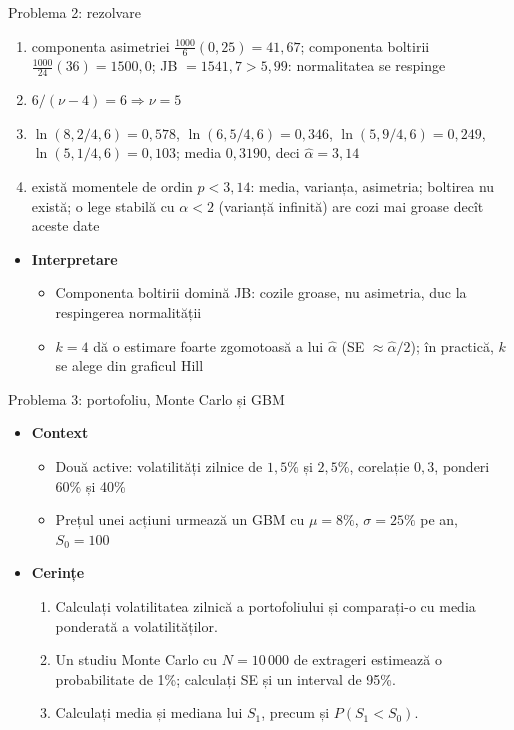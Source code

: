 \begin{frame}{Problema 2: rezolvare}
\itemsize{\footnotesize}
\begin{enumerate}
    \item componenta asimetriei $\frac{1000}{6}(0{,}25) = 41{,}67$; componenta boltirii $\frac{1000}{24}(36) = 1500{,}0$; JB $= 1541{,}7 > 5{,}99$: normalitatea se respinge
    \item $6/(\nu - 4) = 6 \Rightarrow \nu = 5$
    \item $\ln(8{,}2/4{,}6) = 0{,}578$, $\ln(6{,}5/4{,}6) = 0{,}346$, $\ln(5{,}9/4{,}6) = 0{,}249$, $\ln(5{,}1/4{,}6) = 0{,}103$; media $0{,}3190$, deci $\hat\alpha = 3{,}14$
    \item există momentele de ordin $p < 3{,}14$: media, varianța, asimetria; boltirea nu există; o lege stabilă cu $\alpha < 2$ (varianță infinită) are cozi mai groase decît aceste date
\end{enumerate}
\begin{itemize}
    \item \textbf{Interpretare}
    \begin{itemize}
        \item Componenta boltirii domină JB: cozile groase, nu asimetria, duc la respingerea normalității
        \item $k = 4$ dă o estimare foarte zgomotoasă a lui $\hat\alpha$ (SE $\approx \hat\alpha/2$); în practică, $k$ se alege din graficul Hill
    \end{itemize}
\end{itemize}
\end{frame}

\begin{frame}{Problema 3: portofoliu, Monte Carlo și GBM}
\itemsize{\footnotesize}
\begin{itemize}
    \item \textbf{Context}
    \begin{itemize}
        \item Două active: volatilități zilnice de $1{,}5\%$ și $2{,}5\%$, corelație $0{,}3$, ponderi 60\% și 40\%
        \item Prețul unei acțiuni urmează un GBM cu $\mu = 8\%$, $\sigma = 25\%$ pe an, $S_0 = 100$
    \end{itemize}
    \item \textbf{Cerințe}
\begin{enumerate}
    \item Calculați volatilitatea zilnică a portofoliului și comparați-o cu media ponderată a volatilităților.
    \item Un studiu Monte Carlo cu $N = 10\,000$ de extrageri estimează o probabilitate de 1\%; calculați SE și un interval de 95\%.
    \item Calculați media și mediana lui $S_1$, precum și $P(S_1 < S_0)$.
\end{enumerate}
\end{itemize}
\end{frame}

